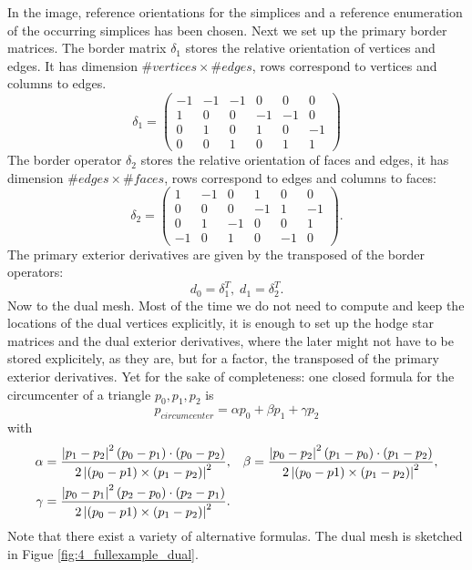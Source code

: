 \begin{center}
\def\svgwidth{12cm}

\end{center}

In the image, reference orientations for the simplices and a reference enumeration of the occurring simplices has been chosen. Next we set up the primary border matrices. The border matrix $\delta_1$ stores the relative orientation of vertices and edges. It has dimension $\#vertices \times \#edges$, rows correspond to vertices and columns to edges.
\[\delta_1 = \begin{pmatrix}
-1 & -1 & -1 & 0 & 0 & 0 \\
1 & 0 & 0 & -1 & -1 & 0 \\
0 & 1 & 0 & 1 &0 &-1 \\
0 & 0 & 1 & 0 & 1 & 1
\end{pmatrix}\]
The border operator $\delta_2$ stores the relative orientation of faces and edges, it has dimension $\#edges \times \#faces$, rows correspond to edges and columns to faces:
\[\delta_2 = \begin{pmatrix}
1 &-1 & 0 & 1 & 0 & 0\\
0 & 0 & 0 & -1 & 1 & -1 \\
0 & 1 & -1 & 0 & 0 & 1 \\
-1 & 0 & 1& 0 & -1 & 0 
\end{pmatrix}.\]
The primary exterior derivatives are given by the transposed of the border operators: 
\[d_0 = \delta_1^T,\; d_1 = \delta_2^T .\] 
Now to the dual mesh.  Most of the time we do not need to compute and keep the locations of the dual vertices explicitly, it is enough to set up the hodge star matrices and the dual exterior derivatives, where the later might not have to be stored explicitely, as they are, but for a factor, the transposed of the primary exterior derivatives. Yet for the sake of completeness: one closed formula for the circumcenter of a triangle ${p_0,p_1,p_2}$ is
\[p_{circumcenter} = \alpha p_0 + \beta p_1 + \gamma p_2\]
with
\begin{align*}\alpha =  \frac{\left| p_1 - p_2 \right|^2 (p_0 - p_1)\cdot (p_0 - p_2)}{2 \left| (p_0 - p1) \times (p_1 - p_2) \right|^2}, & & 
\beta =  \frac{\left| p_0 - p_2 \right|^2 (p_1 - p_0)\cdot (p_1 - p_2)}{2 \left| (p_0 - p1) \times (p_1 - p_2) \right|^2},\\
\gamma =  \frac{\left| p_0 - p_1 \right|^2 (p_2 - p_0)\cdot (p_2 - p_1)}{2 \left| (p_0 - p1) \times (p_1 - p_2) \right|^2}. & &\end{align*}
Note that there exist a variety of alternative formulas. The dual mesh is sketched in Figue \ref{fig:4_fullexample_dual}.

